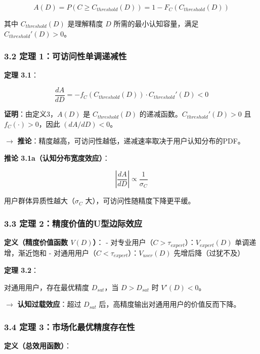 \documentclass[UTF8, fontset=fandol]{ctexart}
\begin{document}
\[A(D) = P(C \geq C_{threshold}(D)) = 1 - F_C(C_{threshold}(D))\]

其中 \(C_{threshold}(D)\) 是理解精度 \(D\) 所需的最小认知容量，满足
\(C_{threshold}'(D) > 0\)。

\subsubsection{3.2 定理
1：可访问性单调递减性}\label{ux5b9aux7406-1ux53efux8bbfux95eeux6027ux5355ux8c03ux9012ux51cfux6027}

\textbf{定理 3.1}：

\[\frac{dA}{dD} = -f_C(C_{threshold}(D)) \cdot C_{threshold}'(D) < 0\]

\textbf{证明}：由定义3，\(A(D)\) 是 \(C_{threshold}(D)\)
的递减函数。\(C_{threshold}'(D) > 0\) 且 \(f_C(\cdot) > 0\)，因此
\((dA/dD) < 0\)。

$\rightarrow$
\textbf{推论}：精度越高，可访问性越低，递减速率取决于用户认知分布的PDF。

\textbf{推论 3.1a（认知分布宽度效应）}：

\[\left|\frac{dA}{dD}\right| \propto \frac{1}{\sigma_C}\]

用户群体异质性越大（\(\sigma_C\) 大），可访问性随精度下降更平缓。

\subsubsection{3.3 定理
2：精度价值的U型边际效应}\label{ux5b9aux7406-2ux7cbeux5ea6ux4ef7ux503cux7684uux578bux8fb9ux9645ux6548ux5e94}

\textbf{定义（精度价值函数 \(V(D)\)）}： -
对专业用户（\(C > \tau_{expert}\)）：\(V_{expert}(D)\)
单调递增，渐近饱和 -
对通用用户（\(C < \tau_{expert}\)）：\(V_{user}(D)\)
先增后降（过犹不及）

\textbf{定理 3.2}：

对通用用户，存在最优精度 \(D_{sat}\)，当 \(D > D_{sat}\) 时
\(V'(D) < 0\)。

 $\rightarrow$ \textbf{认知过载效应}：超过 \(D_{sat}\)
后，高精度输出对通用用户的价值反而下降。

\subsubsection{3.4 定理
3：市场化最优精度存在性}\label{ux5b9aux7406-3ux5e02ux573aux5316ux6700ux4f18ux7cbeux5ea6ux5b58ux5728ux6027}

\textbf{定义（总效用函数）}：
\end{document}
